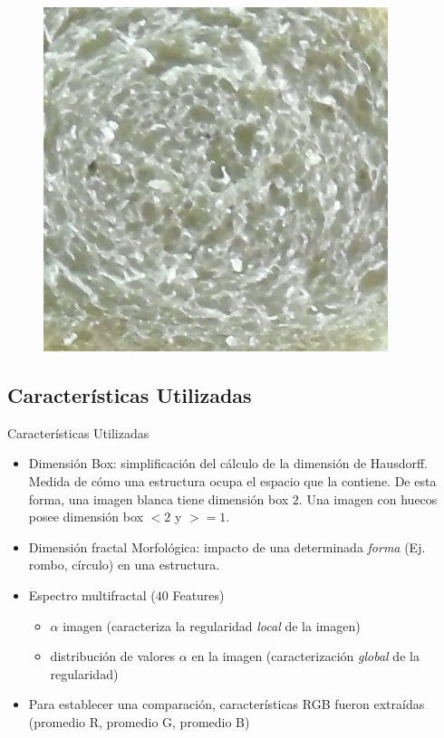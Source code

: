 \documentclass{beamer}
\begin{document}
\begin{frame}
\begin{itemize}
\begin{figure}
\includegraphics[scale=0.2]{../imagenes/camera/b}
\end{figure}


\end{itemize}
\end{frame}

\subsection{Caracter\'isticas Utilizadas}
\begin{frame}
{\huge Caracter\'isticas Utilizadas}
\begin{itemize}
\item Dimensi\'on Box: simplificaci\'on del c\'alculo de la dimensi\'on de Hausdorff. Medida de c\'omo una estructura ocupa el espacio que la contiene. De esta forma, una imagen blanca tiene dimensi\'on box $2$. Una imagen con huecos posee dimensi\'on box $< 2$ y $>= 1$.
\item Dimensi\'on fractal Morfol\'ogica: impacto de una determinada {\em forma} (Ej. rombo, c\'irculo) en una estructura.
\item Espectro multifractal ($40$ Features)
    \begin{itemize}
        \item $\alpha$ imagen (caracteriza la regularidad {\em local} de la imagen)
        \item distribuci\'on de valores $\alpha$ en la imagen (caracterizaci\'on {\em global} de la regularidad)
    \end{itemize}
\item Para establecer una comparaci\'on, caracter\'isticas RGB fueron extra\'idas (promedio R, promedio G, promedio B)
\end{itemize}

\end{frame}
\end{document}
